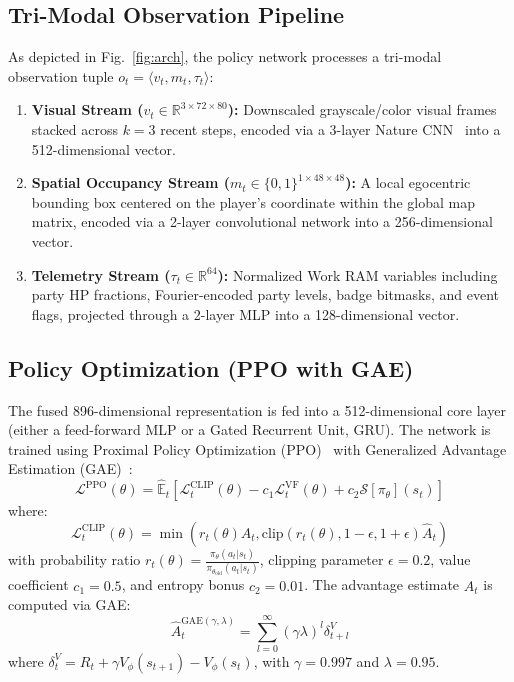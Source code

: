 \documentclass[conference]{IEEEtran}
\begin{document}
\subsection{Tri-Modal Observation Pipeline}
As depicted in Fig.~\ref{fig:arch}, the policy network processes a tri-modal observation tuple $o_t = \langle v_t, m_t, \tau_t \rangle$:
\begin{enumerate}
    \item \textbf{Visual Stream ($v_t \in \mathbb{R}^{3 \times 72 \times 80}$):} Downscaled grayscale/color visual frames stacked across $k=3$ recent steps, encoded via a 3-layer Nature CNN~\cite{mnih2015human} into a 512-dimensional vector.
    \item \textbf{Spatial Occupancy Stream ($m_t \in \{0, 1\}^{1 \times 48 \times 48}$):} A local egocentric bounding box centered on the player's coordinate within the global map matrix, encoded via a 2-layer convolutional network into a 256-dimensional vector.
    \item \textbf{Telemetry Stream ($\tau_t \in \mathbb{R}^{64}$):} Normalized Work RAM variables including party HP fractions, Fourier-encoded party levels, badge bitmasks, and event flags, projected through a 2-layer MLP into a 128-dimensional vector.
\end{enumerate}

\subsection{Policy Optimization (PPO with GAE)}
The fused 896-dimensional representation is fed into a 512-dimensional core layer (either a feed-forward MLP or a Gated Recurrent Unit, GRU). The network is trained using Proximal Policy Optimization (PPO)~\cite{schulman2017proximal} with Generalized Advantage Estimation (GAE)~\cite{schulman2015high}:
\begin{equation}
\mathcal{L}^{\text{PPO}}(\theta) = \hat{\mathbb{E}}_t \left[ \mathcal{L}_t^{\text{CLIP}}(\theta) - c_1 \mathcal{L}_t^{\text{VF}}(\theta) + c_2 \mathcal{S}[\pi_\theta](s_t) \right]
\end{equation}
where:
\begin{equation}
\mathcal{L}_t^{\text{CLIP}}(\theta) = \min\left( r_t(\theta) \hat{A}_t, \text{clip}(r_t(\theta), 1-\epsilon, 1+\epsilon) \hat{A}_t \right)
\end{equation}
with probability ratio $r_t(\theta) = \frac{\pi_\theta(a_t | s_t)}{\pi_{\theta_{\text{old}}}(a_t | s_t)}$, clipping parameter $\epsilon = 0.2$, value coefficient $c_1 = 0.5$, and entropy bonus $c_2 = 0.01$. The advantage estimate $\hat{A}_t$ is computed via GAE:
\begin{equation}
\hat{A}_t^{\text{GAE}(\gamma, \lambda)} = \sum_{l=0}^\infty (\gamma \lambda)^l \delta_{t+l}^V
\end{equation}
where $\delta_t^V = R_t + \gamma V_\phi(s_{t+1}) - V_\phi(s_t)$, with $\gamma = 0.997$ and $\lambda = 0.95$.
\end{document}
